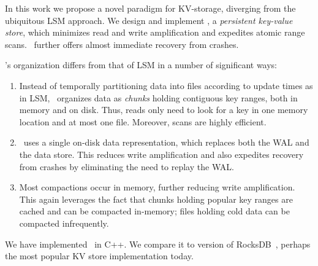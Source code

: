 In this work we propose a novel paradigm for KV-storage, diverging from the ubiquitous LSM approach.  
We design and implement  \sys,  a \emph{persistent key-value store}, which minimizes read and write
amplification and expedites atomic range scans. 
 \sys\ further offers almost immediate recovery from  crashes. 
 

\sys's organization differs from that of LSM  in a number of significant ways: 
\begin{enumerate}
\item Instead of temporally partitioning data into files according to update times as in LSM, 
\sys\ organizes data as  \emph{chunks} holding contiguous key ranges, both in memory and on disk. 
Thus, reads
only need to look for a key in one memory location and at most one file. Moreover, scans are highly efficient.


\item \sys\ uses a single on-disk data representation, which replaces both the WAL and the data store.  
This reduces write amplification %
and also expedites recovery from crashes by eliminating the need to replay the WAL. 
\item Most compactions occur in memory, further reducing write amplification. This again leverages the fact that chunks holding
popular key ranges are cached and can be compacted in-memory; files holding cold data can be compacted infrequently. 
 \end{enumerate}


We have implemented \sys\ in C++. We compare it to version  of RocksDB~\cite{rocks}, perhaps the most popular KV store implementation today.  




